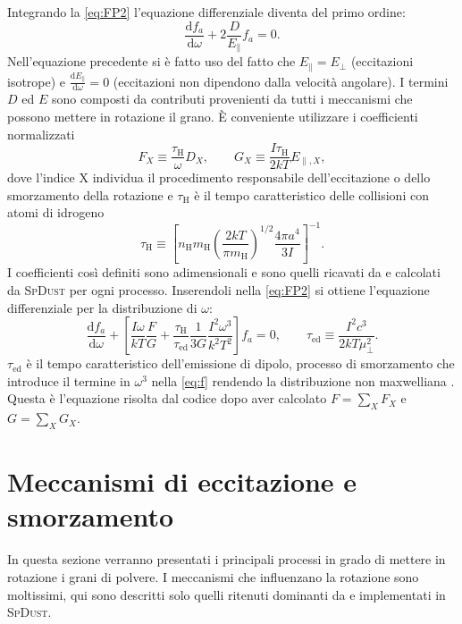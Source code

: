 Integrando la \ref{eq:FP2} l'equazione differenziale diventa del primo ordine:
\begin{equation}
\frac{\mathrm{d}f_a}{\mathrm{d}\omega} + 2 \frac{D}{E_\parallel} f_a = 0. 
\end{equation}
Nell'equazione precedente si è fatto uso del fatto che $E_\parallel = E_\perp$ (eccitazioni isotrope) e $\frac{\mathrm{d}E_\parallel}{\mathrm{d}\omega} = 0$ (eccitazioni non dipendono dalla velocità angolare).
I termini $D$ ed $E$ sono composti da contributi provenienti da tutti i meccanismi che possono mettere in rotazione il grano. È conveniente utilizzare i coefficienti normalizzati
\begin{equation}
\label{FG}
F_X \equiv \frac{\tau_\mathrm{H}}{\omega} D_X, \qquad
G_X \equiv \frac{I\tau_{\mathrm{H}}}{2kT} E_{\parallel,X},
\end{equation}
dove l'indice X individua il procedimento responsabile dell'eccitazione o dello smorzamento della rotazione e $\tau_{\mathrm{H}}$ è il tempo caratteristico delle collisioni con atomi di idrogeno
\begin{equation}
\tau_{\mathrm{H}} \equiv \left[ n_{\mathrm{H}}m_{\mathrm{H}} \left( \frac{2kT}{\pi m_{\mathrm{H}}}\right) ^{1/2} \frac{4\pi a^4}{3I} \right] ^{-1}.
\end{equation}
I coefficienti così definiti sono adimensionali e sono quelli ricavati da \textcite{Ali} e calcolati da  \textsc{SpDust} per ogni processo. Inserendoli nella \ref{eq:FP2} si ottiene l'equazione differenziale per la distribuzione di $\omega$:
\begin{equation}
\label{eq:f}
\frac{\mathrm{d}f_a}{\mathrm{d}\omega} + \left[ \frac{I\omega}{kT} \frac{F}{G} + \frac{\tau_{\mathrm{H}}}{\tau_{\mathrm{ed}}} \frac{1}{3G} \frac{I^2\omega^3}{k^2T^2} \right] f_a = 0, \qquad
\tau_{\mathrm{ed}} \equiv \frac{I^2c^3}{2kT\mu_\perp^2}.
\end{equation}
$\tau_{\mathrm{ed}}$ è il tempo caratteristico dell'emissione di dipolo, processo di smorzamento che introduce il termine in $\omega^3$ nella \ref{eq:f} rendendo la distribuzione non maxwelliana \parencite[vedi][]{Ali}.
Questa è l'equazione risolta dal codice dopo aver calcolato $F = \sum_{X} F_X$ e $G = \sum_{X} G_X$.

\section{Meccanismi di eccitazione e smorzamento}

In questa sezione verranno presentati i principali processi in grado di mettere in rotazione i grani di polvere. I meccanismi che influenzano la rotazione sono moltissimi, qui sono descritti solo quelli ritenuti dominanti da \textcite{DL98b} e implementati in \textsc{SpDust}.

